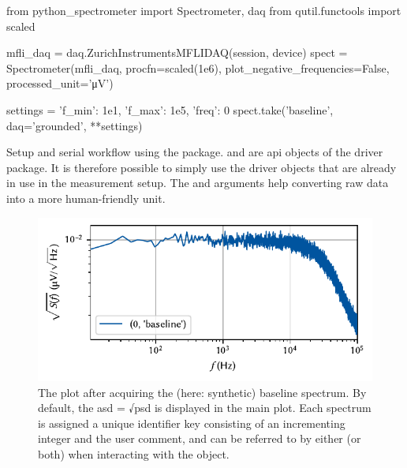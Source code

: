 \begin{listing}[htpb]
    \begin{pycode}
        from python_spectrometer import Spectrometer, daq
        from qutil.functools import scaled

        mfli_daq = daq.ZurichInstrumentsMFLIDAQ(session, device)
        spect = Spectrometer(mfli_daq, procfn=scaled(1e6),
                             plot_negative_frequencies=False,
                             processed_unit='μV')

        settings = {'f_min': 1e1, 'f_max': 1e5, 'freq': 0}
        spect.take('baseline', daq='grounded', **settings)
    \end{pycode}
    \caption[\pyspeck serial workflow]{
        Setup and serial workflow using the \pyspeck package.
         and  are \gls{api} objects of the  driver package.
        It is therefore possible to simply use the driver objects that are already in use in the measurement setup.
        The  and  arguments help converting raw data into a more human-friendly unit.
    }
    \label{lst:speck:workflow:serial}
\end{listing}
\begin{figure}
    \centering
    \includegraphics{img/pdf/spectrometer/workflow_baseline}
    \caption[]{
        The \pyspeck plot after acquiring the (here: synthetic) baseline spectrum.
        By default, the \gls{asd} = √\gls{psd} is displayed in the main plot.
        Each spectrum is assigned a unique identifier key consisting of an incrementing integer and the user comment, and can be referred to by either (or both) when interacting with the object.
    }
    \label{fig:speck:software:workflow:baseline}
\end{figure}

